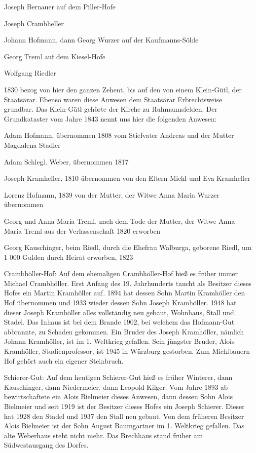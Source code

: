 \documentclass[12pt,a4pager]{book}
\begin{document}
Joseph Bernauer auf dem Piller-Hofe

Joseph Crambheller

Johann Hofmann, dann Georg Wurzer auf der Kaufmanns-Sölde

Georg Treml auf dem Kiesel-Hofe

Wolfgang Riedler

1830 bezog von hier den ganzen Zehent, bis auf den von einem Klein-Gütl, der
Staatsärar. Ebenso waren diese Anwesen dem Staatsärar Erbrechtsweise grundbar.
Das Klein-Gütl gehörte der Kirche zu Ruhmannsfelden. Der Grundkataster vom Jahre
1843 nennt uns hier die folgenden Anwesen:

Adam Hofmann, übernommen 1808 vom Stiefvater Andreas und der Mutter Magdalena
Stadler

Adam Schlegl, Weber, übernommen 1817

Joseph Kramheller, 1810 übernommen von den Eltern Michl und Eva Kramheller

Lorenz Hofmann, 1839 von der Mutter, der Witwe Anna Maria Wurzer übernommen

Georg und Anna Maria Treml, nach dem Tode der Mutter, der Witwe Anna Maria Treml
aus der Verlassenschaft 1820 erworben

Georg Kauschinger, beim Riedl, durch die Ehefrau Walburga, geborene Riedl, um 1
000 Gulden durch Heirat erworben, 1823

Crambhöller-Hof: Auf dem ehemaligen Crambhöller-Hof hieß es früher immer Michael
Crambhöller. Erst Anfang des 19. Jahrhunderts taucht als Besitzer dieses Hofes
ein Martin Kramhöller auf. 1894 hat dessen Sohn Martin Kramhöller den Hof
übernommen und 1933 wieder dessen Sohn Joseph Kramhöller. 1948 hat dieser Joseph
Kramhöller alles vollständig neu gebaut, Wohnhaus, Stall und Stadel. Das Inhaus
ist bei dem Brande 1902, bei welchem das Hofmann-Gut abbrannte, zu Schaden
gekommen. Ein Bruder des Joseph Kramhöller, nämlich Johann Kramhöller, ist im 1.
Weltkrieg gefallen. Sein jüngster Bruder, Alois Kramhöller, Studienprofessor,
ist 1945 in Würzburg gestorben. Zum Michlbauern-Hof gehört auch ein eigener
Steinbruch.

Schierer-Gut: Auf dem heutigen Schierer-Gut hieß es früher Winterer, dann
Kauschinger, dann Niedermeier, dann Leopold Kilger. Vom Jahre 1893 ab
bewirtschaftete ein Alois Bielmeier dieses Anwesen, dann dessen Sohn Alois
Bielmeier und seit 1919 ist der Besitzer dieses Hofes ein Joseph Schierer.
Dieser hat 1928 den Stadel und 1937 den Stall neu gebaut. Von dem früheren
Besitzer Alois Bielmeier ist der Sohn August Baumgartner im 1. Weltkrieg
gefallen. Das alte Weberhaus steht nicht mehr. Das Brechhaus stand früher am
Südwestausgang des Dorfes.
\end{document}
